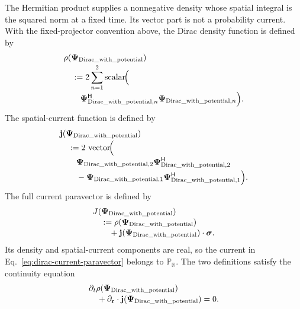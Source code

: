 \documentclass[10pt,letterpaper]{article}
\let\STAamsmathtext\text
\newcommand{\eqtext}[1]{\STAamsmathtext{\normalfont\rmfamily #1}}
\newcommand{\eqfunc}[1]{\operatorname{#1}}
\renewcommand{\text}[1]{\STAamsmathtext{\normalfont\rmfamily #1}}
\newcommand{\R}{\mathbb{R}}
\newcommand{\Pspace}{\mathbb{P}}
\newcommand{\RPspace}{\Pspace_{\R}}
\newcommand{\pv}[1]{#1}
\newcommand{\vct}[1]{\mathbf{#1}}
\newcommand{\sigv}{\vct{\pv{\bm{\sigma}}}}
\newcommand{\bPsi}{\pv{\bm{\Psi}}}
\newcommand{\delop}{\partial}
\newcommand{\delr}{\delop_{\vct{r}}}
\newcommand{\gradv}{\delr}
\newcommand{\Hop}{\mathsf H}
\newcommand{\herm}[1]{#1^{\Hop}}
\begin{document}
The Hermitian product supplies a nonnegative density whose spatial integral
is the squared norm at a fixed time. Its vector part is not a probability
current. With the fixed-projector convention above, the Dirac density function
is defined by
\begin{equation}
\begin{aligned}
&\rho(\bPsi_{\eqtext{Dirac\_with\_potential}})\\[-0.2em]
&\quad:=2\sum_{n=1}^{2}
\eqfunc{scalar}\!\Bigl(\\[-0.2em]
&\qquad
\herm{\bPsi_{\eqtext{Dirac\_with\_potential},n}}
\bPsi_{\eqtext{Dirac\_with\_potential},n}
\Bigr).
\end{aligned}
\label{eq:dirac-density}
\end{equation}
The spatial-current function is defined by
\begin{equation}
\begin{aligned}
&\vct{j}(\bPsi_{\eqtext{Dirac\_with\_potential}})\\[-0.2em]
&\quad:=2\,\eqfunc{vector}\!\Bigl(\\[-0.2em]
&\qquad
\bPsi_{\eqtext{Dirac\_with\_potential},2}
\herm{\bPsi_{\eqtext{Dirac\_with\_potential},2}}\\[-0.1em]
&\qquad
-\bPsi_{\eqtext{Dirac\_with\_potential},1}
\herm{\bPsi_{\eqtext{Dirac\_with\_potential},1}}
\Bigr).
\end{aligned}
\label{eq:dirac-spatial-current}
\end{equation}
The full current paravector is defined by
\begin{equation}
\begin{aligned}
&\pv{J}(\bPsi_{\eqtext{Dirac\_with\_potential}})\\[-0.2em]
&\quad:=\rho(\bPsi_{\eqtext{Dirac\_with\_potential}})\\[-0.2em]
&\qquad
+\vct{j}(\bPsi_{\eqtext{Dirac\_with\_potential}})
\cdot\sigv.
\end{aligned}
\label{eq:dirac-current-paravector}
\end{equation}
Its density and spatial-current components are real, so the current in
Eq.\ \eqref{eq:dirac-current-paravector} belongs to \(\RPspace\).
The two definitions satisfy the continuity equation
\begin{equation}
\begin{aligned}
&\partial_t\rho(\bPsi_{\eqtext{Dirac\_with\_potential}})\\[-0.2em]
&\quad+\gradv\cdot
\vct{j}(\bPsi_{\eqtext{Dirac\_with\_potential}})=0.
\end{aligned}
\label{eq:dirac-current}
\end{equation}
\end{document}
